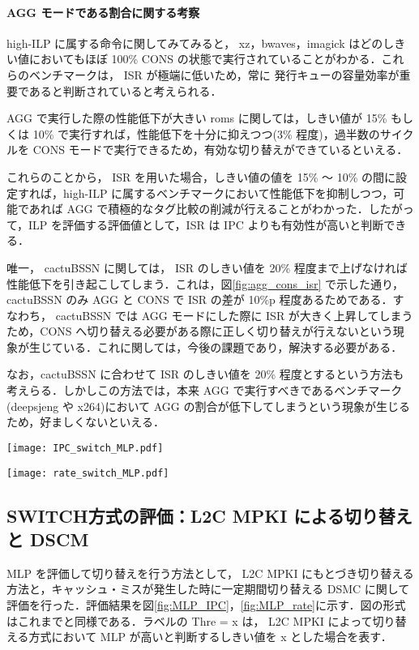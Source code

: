 \documentclass[twocolumn]{jsarticle}
\begin{document}
  \paragraph{AGG モードである割合に関する考察}
  high-ILP に属する命令に関してみてみると， xz，bwaves，imagick はどのしきい値においてもほぼ 100\% CONS の状態で実行されていることがわかる．これらのベンチマークは， ISR が極端に低いため，常に 発行キューの容量効率が重要であると判断されていると考えられる．

   AGG で実行した際の性能低下が大きい roms に関しては，しきい値が 15\% もしくは 10\% で実行すれば，性能低下を十分に抑えつつ(3\% 程度)，過半数のサイクルを CONS モードで実行できるため，有効な切り替えができているといえる．

   これらのことから， ISR を用いた場合，しきい値の値を 15\% ～ 10\% の間に設定すれば，high-ILP に属するベンチマークにおいて性能低下を抑制しつつ，可能であれば AGG で積極的なタグ比較の削減が行えることがわかった．したがって，ILP を評価する評価値として，ISR は IPC よりも有効性が高いと判断できる．

   唯一， cactuBSSN に関しては， ISR のしきい値を 20\% 程度まで上げなければ性能低下を引き起こしてしまう．これは，図\ref{fig:agg_cons_isr} で示した通り，cactuBSSN のみ AGG と CONS で ISR の差が 10\%p 程度あるためである．すなわち， cactuBSSN では AGG モードにした際に ISR が大きく上昇してしまうため，CONS へ切り替える必要がある際に正しく切り替えが行えないという現象が生じている．これに関しては，今後の課題であり，解決する必要がある．

   なお，cactuBSSN に合わせて ISR のしきい値を 20\% 程度とするという方法も考えらる．しかしこの方法では，本来 AGG で実行すべきであるベンチマーク(deepsjeng や x264)において AGG の割合が低下してしまうという現象が生じるため，好ましくないといえる． 

   \begin{figure*}[ht]
    \centering
    \texttt{[image: IPC\_switch\_MLP.pdf]}
    \caption{SWITCH 方式による性能変化(MLP を用いた方式)}  
    \label{fig:MLP_IPC}
  \end{figure*}
  \begin{figure*}[ht]
    \centering
    \texttt{[image: rate\_switch\_MLP.pdf]}
    \caption{AGG モードである割合(MLP を用いた方式)}  
    \label{fig:MLP_rate}
  \end{figure*}

  \subsection{SWITCH方式の評価：L2C MPKI による切り替えと DSCM}
  MLP を評価して切り替えを行う方法として， L2C MPKI にもとづき切り替える方法と，キャッシュ・ミスが発生した時に一定期間切り替える DSMC に関して評価を行った．評価結果を図\ref{fig:MLP_IPC}，\ref{fig:MLP_rate}に示す．図の形式はこれまでと同様である．ラベルの Thre = x は， L2C MPKI によって切り替える方式において MLP が高いと判断するしきい値を x とした場合を表す．
  
\end{document}
